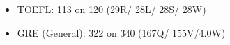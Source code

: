 \begin{itemize}[noitemsep]
\item TOEFL: 113 on 120 (29R/ 28L/ 28S/ 28W)
\item GRE (General): 322 on 340 (167Q/ 155V/4.0W)
\end{itemize}
\vspace{-0.4cm}